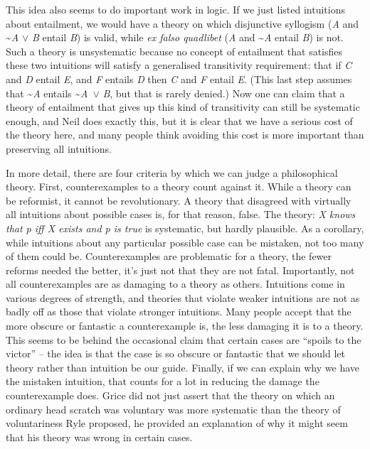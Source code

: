This idea also seems to do important work in logic. If we just listed intuitions about entailment, we would have a theory on which disjunctive syllogism (\textit{A} and \~{}\textit{A} ${\vee}$ \textit{B} entail \textit{B}) is valid, while \textit{ex falso quadlibet} (\textit{A} and \~{}\textit{A} entail \textit{B}) is not. Such a theory is unsystematic because no concept of entailment that satisfies these two intuitions will satisfy a generalised transitivity requirement: that if \textit{C} and \textit{D} entail \textit{E}, and \textit{F} entails \textit{D} then \textit{C} and \textit{F} entail \textit{E}. (This last step assumes that \~{}\textit{A} entails \~{}\textit{A}~${\vee}$ \textit{B}, but that is rarely denied.) Now one can claim that a theory of entailment that gives up this kind of transitivity can still be systematic enough, and Neil \citet{Tennant1992} does exactly this, but it is clear that we have a serious cost of the theory here, and many people think avoiding this cost is more important than preserving all intuitions.

In more detail, there are four criteria by which we can judge a philosophical theory. First, counterexamples to a theory count against it. While a theory can be reformist, it cannot be revolutionary. A theory that disagreed with virtually all intuitions about possible cases is, for that reason, false. The theory: \textit{X knows that p iff X exists and p is true} is systematic, but hardly plausible. As a corollary, while intuitions about any particular possible case can be mistaken, not too many of them could be. Counterexamples are problematic for a theory, the fewer reforms needed the better, it's just not that they are not fatal. Importantly, not all counterexamples are as damaging to a theory as others. Intuitions come in various degrees of strength, and theories that violate weaker intuitions are not as badly off as those that violate stronger intuitions. Many people accept that the more obscure or fantastic a counterexample is, the less damaging it is to a theory. This seems to be behind the occasional claim that certain cases are ``spoils to the victor'' -- the idea is that the case is so obscure or fantastic that we should let theory rather than intuition be our guide. Finally, if we can explain why we have the mistaken intuition, that counts for a lot in reducing the damage the counterexample does. Grice did not just assert that the theory on which an ordinary head scratch was voluntary was more systematic than the theory of voluntariness Ryle proposed, he provided an explanation of why it might seem that his theory was wrong in certain cases.

